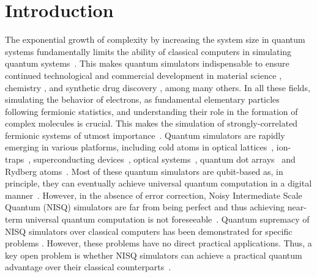 \documentclass[aps, pra, reprint, superscriptaddress]{revtex4-1}
\begin{document}
\maketitle


\section{Introduction}

The exponential growth of complexity by increasing the system size in quantum systems fundamentally limits the ability of classical computers in simulating quantum systems~\citep{feynman1982simulating,lloyd1996universal}. 
This makes quantum simulators indispensable to ensure continued technological and commercial development in material science \cite{ma2020quantum,PhysRevX.8.011044,PhysRevLett.120.110501}, chemistry \cite{hempel_quantum_2018,cao2019quantum,arguello2019analogue,bauer2020quantum}, and synthetic drug discovery \cite{Cavasotto2020}, among many others.
In all these fields, simulating the behavior of electrons, as fundamental elementary particles following fermionic statistics, and understanding their role in the formation of complex molecules is crucial. 
This makes the simulation of strongly-correlated fermionic systems of utmost importance~\cite{georgescu2014quantum,stanisic2022observing}. 
Quantum simulators are rapidly emerging in various platforms, including cold atoms in optical lattices~\cite{bloch2012quantum,gross_quantum_2017,zhou2022thermalization}, ion-traps~\cite{ barreiro2011open,lanyon2011universal,blatt2012quantum,monroe2021programmable,kokail2019self}, superconducting devices~\cite{houck2012chip,arute2019quantum,google2020hartree,gong2021quantum,wu2021strong}, optical systems~\cite{aspuru2012photonic,wang2019boson,wang2020integrated,bao2023very,zhong2020quantum}, quantum dot arrays~\cite{byrnes2008quantum,hensgens2017quantum,mortemousque2021coherent} and Rydberg atoms~\cite{weimer2010rydberg,labuhn2016tunable,schauss2018quantum,Nguyen2018towards,keesling2019quantum,Omran2019Generation,browaeys2020many,scholl2021quantum,cohen2021quantum,young2022tweezer,yan2022two-dimensional,wu2021concise,cheng2023variational}. 
Most of these quantum simulators are qubit-based as, in principle, they can eventually achieve universal quantum computation in a digital manner~\cite{lloyd1996universal}. 
However, in the absence of error correction, Noisy Intermediate Scale Quantum (NISQ) simulators are far from being perfect and thus achieving near-term universal quantum computation is not foreseeable~\cite{Preskill2018quantumcomputingin, bharti2022noisy}. 
Quantum supremacy of NISQ simulators over classical computers has been demonstrated for specific problems \cite{arute2019quantum,zhong2020quantum,wu2021strong,gong2021quantum}. 
However, these problems have no direct practical applications.
Thus, a key open problem is whether NISQ simulators can achieve a practical quantum advantage over their classical counterparts~\cite{daley2022practical}. 
\end{document}
